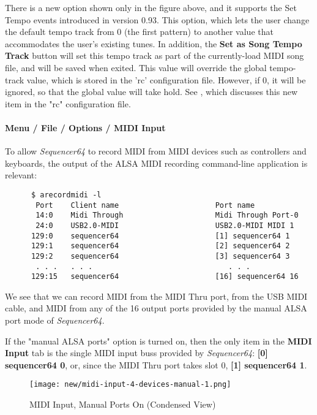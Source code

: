    There is a new option shown only in the figure above, and it supports the
   Set Tempo events introduced in version 0.93.  This option, which lets the
   user change the default tempo track from 0 (the first pattern) to another
   value that accommodates the user's existing tunes.
   In addition, the \textbf{Set as Song Tempo Track} button will set this tempo
   track as part of the currently-load MIDI song file, and will be saved when
   exited.  This value will override the global tempo-track value, which is
   stored in the 'rc' configuration file.  However, if 0, it will be ignored,
   so that the global value will take hold.
   See , which discusses this
   new item in the "rc" configuration file.

\paragraph{Menu / File / Options / MIDI Input}
\label{paragraph:seq64_menu_file_options_midi_input}

   To allow \textsl{Sequencer64} to record MIDI from MIDI devices such as
   controllers and keyboards, the output of the ALSA MIDI recording
   command-line application is relevant:

   \begin{verbatim}
      $ arecordmidi -l
       Port    Client name                      Port name
       14:0    Midi Through                     Midi Through Port-0
       24:0    USB2.0-MIDI                      USB2.0-MIDI MIDI 1
      129:0    sequencer64                      [1] sequencer64 1
      129:1    sequencer64                      [2] sequencer64 2
      129:2    sequencer64                      [3] sequencer64 3
       . . .   . . .                               . . .
      129:15   sequencer64                      [16] sequencer64 16
   \end{verbatim}

   We see that we can record MIDI from the MIDI Thru port, from the USB MIDI
   cable, and MIDI from any of the 16 output ports provided by the manual ALSA
   port mode of \textsl{Sequencer64}.

   If the "manual ALSA ports" option is turned on,
   then the only item in the \textbf{MIDI Input} tab is the single MIDI input
   buss provided by \textsl{Sequencer64}:  \textbf{[0] sequencer64 0}, or, since
   the MIDI Thru port takes slot 0, \textbf{[1] sequencer64 1}.

\begin{figure}[H]
   \centering 
   \texttt{[image: new/midi-input-4-devices-manual-1.png]}
   \caption{MIDI Input, Manual Ports On (Condensed View)}
   \label{fig:seq64_midi_input_4_devices_manual_1}
\end{figure}

